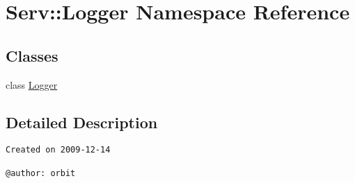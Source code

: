 \hypertarget{namespace_serv_1_1_logger}{
\section{Serv::Logger Namespace Reference}
\label{namespace_serv_1_1_logger}
}
\subsection*{Classes}
\begin{CompactItemize}
\item 
class \hyperlink{class_serv_1_1_logger_1_1_logger}{Logger}
\end{CompactItemize}


\subsection{Detailed Description}


\footnotesize\begin{verbatim}
Created on 2009-12-14

@author: orbit
\end{verbatim}
\normalsize
 

